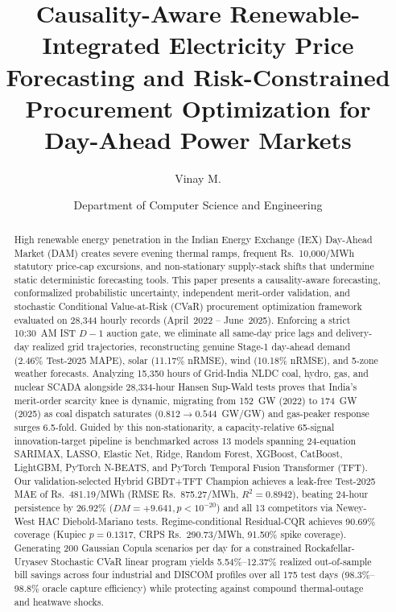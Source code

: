 \documentclass[runningheads,a4paper]{llncs}
\begin{document}
\title{Causality-Aware Renewable-Integrated Electricity Price Forecasting and Risk-Constrained Procurement Optimization for Day-Ahead Power Markets}

\author{Vinay M. \and Department of Computer Science and Engineering}

\maketitle

\begin{abstract}
High renewable energy penetration in the Indian Energy Exchange (IEX) Day-Ahead Market (DAM) creates severe evening thermal ramps, frequent Rs.~10,000/MWh statutory price-cap excursions, and non-stationary supply-stack shifts that undermine static deterministic forecasting tools. This paper presents a causality-aware forecasting, conformalized probabilistic uncertainty, independent merit-order validation, and stochastic Conditional Value-at-Risk (CVaR) procurement optimization framework evaluated on 28,344 hourly records (April~2022 -- June~2025). Enforcing a strict 10:30~AM IST $D-1$ auction gate, we eliminate all same-day price lags and delivery-day realized grid trajectories, reconstructing genuine Stage-1 day-ahead demand (2.46\% Test-2025 MAPE), solar (11.17\% nRMSE), wind (10.18\% nRMSE), and 5-zone weather forecasts. Analyzing 15,350 hours of Grid-India NLDC coal, hydro, gas, and nuclear SCADA alongside 28,334-hour Hansen Sup-Wald tests proves that India's merit-order scarcity knee is dynamic, migrating from 152~GW (2022) to 174~GW (2025) as coal dispatch saturates ($0.812 \to 0.544$~GW/GW) and gas-peaker response surges 6.5-fold. Guided by this non-stationarity, a capacity-relative 65-signal innovation-target pipeline is benchmarked across 13 models spanning 24-equation SARIMAX, LASSO, Elastic Net, Ridge, Random Forest, XGBoost, CatBoost, LightGBM, PyTorch N-BEATS, and PyTorch Temporal Fusion Transformer (TFT). Our validation-selected Hybrid GBDT+TFT Champion achieves a leak-free Test-2025 MAE of Rs.~481.19/MWh (RMSE Rs.~875.27/MWh, $R^2=0.8942$), beating 24-hour persistence by 26.92\% ($DM=+9.641, p<10^{-20}$) and all 13 competitors via Newey-West HAC Diebold-Mariano tests. Regime-conditional Residual-CQR achieves 90.69\% coverage (Kupiec $p=0.1317$, CRPS Rs.~290.73/MWh, 91.50\% spike coverage). Generating 200 Gaussian Copula scenarios per day for a constrained Rockafellar-Uryasev Stochastic CVaR linear program yields 5.54\%--12.37\% realized out-of-sample bill savings across four industrial and DISCOM profiles over all 175 test days (98.3\%--98.8\% oracle capture efficiency) while protecting against compound thermal-outage and heatwave shocks.


\end{abstract}
\end{document}
